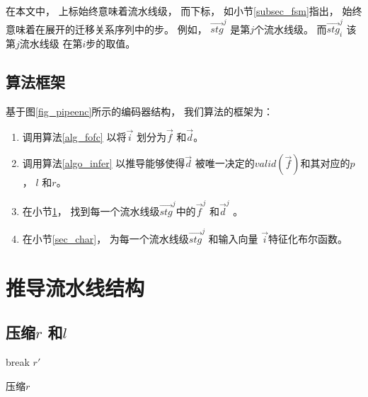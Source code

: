 


在本文中，
上标始终意味着流水线级，
而下标，
如小节\ref{subsec_fsm}指出，
始终意味着在展开的迁移关系序列中的步。
例如，
$\vec{stg}^j$ 是第$j$个流水线级。
而$\vec{stg}^j_i$ 该第$j$流水线级
在第$i$步的取值。

\subsection{算法框架}\label{algo_algoframework}

基于图\ref{fig_pipeenc}所示的编码器结构，
我们算法的框架为：

\begin{enumerate}
 \item 调用算法\ref{alg_fofc} 以将$\vec{i}$ 划分为$\vec{f}$ 和$\vec{d}$。
 \item 调用算法\ref{algo_infer} 以推导能够使得$\vec{d}$
 被唯一决定的$valid(\vec{f})$和其对应的$p$， $l$ 和$r$。
 \item 在小节\ref{sec_pipeinfer}，
 找到每一个流水线级$\vec{stg}^j$中的$\vec{f}^j$ 和$\vec{d}^j$ 。
 \item 在小节\ref{sec_char}，
 为每一个流水线级$\vec{stg}^j$
 和输入向量 $\vec{i}$特征化布尔函数。
\end{enumerate}



\section{推导流水线结构}\label{sec_pipeinfer}


\subsection{压缩$r$ 和$l$}\label{reduceing}

\begin{algorithm}[t]
\begin{algorithmic}[1]
\label{testr_1}
    \STATE break
  \ENDIF
\ENDFOR
\RETURN $r'$
\caption{压缩$r$}
\label{algo_remove2}
\end{algorithmic}
\end{algorithm}

